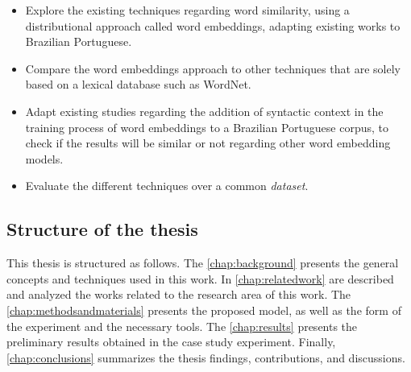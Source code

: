 \begin{itemize}
    \item Explore the existing techniques regarding word similarity, using a distributional approach called word embeddings, adapting existing works to Brazilian Portuguese.
    \item Compare the word embeddings approach to other techniques that are solely based on a lexical database such as WordNet.
    \item Adapt existing studies regarding the addition of syntactic context in the training process of word embeddings to a Brazilian Portuguese corpus, to check if the results will be similar or not regarding other word embedding models. 
    \item Evaluate the different techniques over a common \textit{dataset}.
\end{itemize}

\subsection{Structure of the thesis}

This thesis is structured as follows. The \autoref{chap:background} presents the general concepts and techniques used in this work. In \autoref{chap:relatedwork} are described and analyzed the works related to the research area of this work. The \autoref{chap:methodsandmaterials} presents the proposed model, as well as the form of the experiment and the necessary tools. 
The \autoref{chap:results} presents the preliminary results obtained in the case study experiment. 
Finally, \autoref{chap:conclusions} summarizes the thesis findings, contributions, and discussions.



